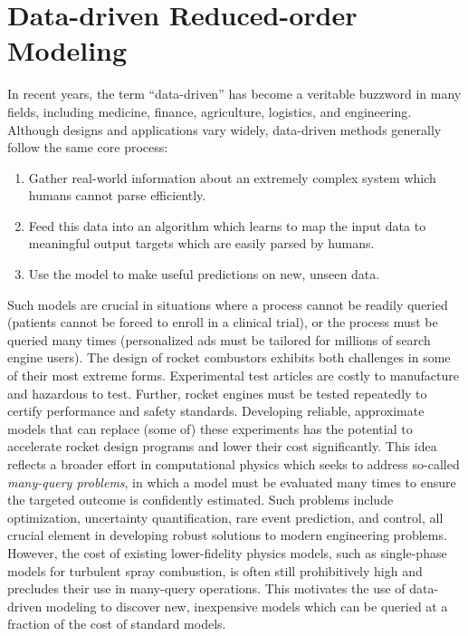\section{Data-driven Reduced-order Modeling}\label{sec:dataDrivenModeling}

In recent years, the term ``data-driven'' has become a veritable buzzword in many fields, including medicine, finance, agriculture, logistics, and engineering. Although designs and applications vary widely, data-driven methods generally follow the same core process:

\begin{enumerate}
    \item Gather real-world information about an extremely complex system which humans cannot parse efficiently.
    \item Feed this data into an algorithm which learns to map the input data to meaningful output targets which are easily parsed by humans.
    \item Use the model to make useful predictions on new, unseen data.
\end{enumerate}

Such models are crucial in situations where a process cannot be readily queried (patients cannot be forced to enroll in a clinical trial), or the process must be queried many times (personalized ads must be tailored for millions of search engine users). The design of rocket combustors exhibits both challenges in some of their most extreme forms. Experimental test articles are costly to manufacture and hazardous to test. Further, rocket engines must be tested repeatedly to certify performance and safety standards. Developing reliable, approximate models that can replace (some of) these experiments has the potential to accelerate rocket design programs and lower their cost significantly. This idea reflects a broader effort in computational physics which seeks to address so-called \textit{many-query problems}, in which a model must be evaluated many times to ensure the targeted outcome is confidently estimated. Such problems include optimization, uncertainty quantification, rare event prediction, and control, all crucial element in developing robust solutions to modern engineering problems. However, the cost of existing lower-fidelity physics models, such as single-phase models for turbulent spray combustion, is often still prohibitively high and precludes their use in many-query operations. This motivates the use of data-driven modeling to discover new, inexpensive models which can be queried at a fraction of the cost of standard models.

